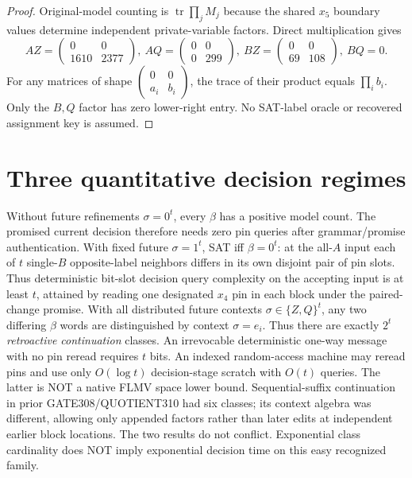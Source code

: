 \documentclass[11pt]{article}
\begin{document}
\begin{proof}
Original-model counting is $\operatorname{tr}\prod_jM_j$ because the shared $x_5$ boundary values determine independent private-variable factors. Direct multiplication gives
\[
AZ=\begin{pmatrix}0&0\\1610&2377\end{pmatrix},\
AQ=\begin{pmatrix}0&0\\0&299\end{pmatrix},\
BZ=\begin{pmatrix}0&0\\69&108\end{pmatrix},\
BQ=0.
\]
For any matrices of shape $\left(\begin{smallmatrix}0&0\\a_i&b_i\end{smallmatrix}\right)$, the trace of their product equals $\prod_i b_i$. Only the $B,Q$ factor has zero lower-right entry. No SAT-label oracle or recovered assignment key is assumed.
\end{proof}
\section{Three quantitative decision regimes}
Without future refinements $\sigma=0^t$, every $\beta$ has a positive model count. The promised current decision therefore needs zero pin queries after grammar/promise authentication. With fixed future $\sigma=1^t$, SAT iff $\beta=0^t$: at the all-$A$ input each of $t$ single-$B$ opposite-label neighbors differs in its own disjoint pair of pin slots. Thus deterministic bit-slot decision query complexity on the accepting input is at least $t$, attained by reading one designated $x_4$ pin in each block under the paired-change promise. With all distributed future contexts $\sigma\in\{Z,Q\}^t$, any two differing $\beta$ words are distinguished by context $\sigma=e_i$. Thus there are exactly $2^t$ \emph{retroactive continuation} classes. An irrevocable deterministic one-way message with no pin reread requires $t$ bits. An indexed random-access machine may reread pins and use only $O(\log t)$ decision-stage scratch with $O(t)$ queries. The latter is NOT a native FLMV space lower bound.
Sequential-suffix continuation in prior GATE308/QUOTIENT310 had six classes; its context algebra was different, allowing only appended factors rather than later edits at independent earlier block locations. The two results do not conflict. Exponential class cardinality does NOT imply exponential decision time on this easy recognized family.
\end{document}
